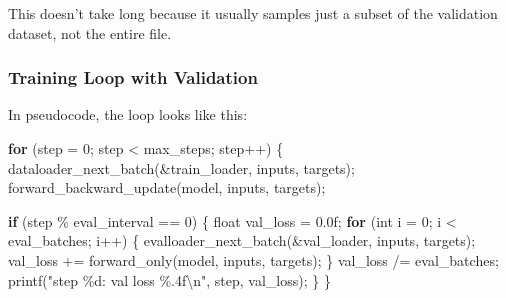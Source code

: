 \documentclass[
  letterpaper,
  DIV=11,
  numbers=noendperiod]{scrreprt}
\newenvironment{Shaded}{\begin{snugshade}}{\end{snugshade}}
\newcommand{\BuiltInTok}[1]{\textcolor[rgb]{0.00,0.23,0.31}{#1}}
\newcommand{\ControlFlowTok}[1]{\textcolor[rgb]{0.00,0.23,0.31}{\textbf{#1}}}
\newcommand{\DataTypeTok}[1]{\textcolor[rgb]{0.68,0.00,0.00}{#1}}
\newcommand{\DecValTok}[1]{\textcolor[rgb]{0.68,0.00,0.00}{#1}}
\newcommand{\FloatTok}[1]{\textcolor[rgb]{0.68,0.00,0.00}{#1}}
\newcommand{\NormalTok}[1]{\textcolor[rgb]{0.00,0.23,0.31}{#1}}
\newcommand{\OperatorTok}[1]{\textcolor[rgb]{0.37,0.37,0.37}{#1}}
\newcommand{\SpecialCharTok}[1]{\textcolor[rgb]{0.37,0.37,0.37}{#1}}
\newcommand{\StringTok}[1]{\textcolor[rgb]{0.13,0.47,0.30}{#1}}
\begin{document}
This doesn't take long because it usually samples just a subset of the
validation dataset, not the entire file.

\subsubsection{Training Loop with
Validation}\label{training-loop-with-validation}

In pseudocode, the loop looks like this:

\begin{Shaded}
\begin{Highlighting}[]
\ControlFlowTok{for} \OperatorTok{(}\NormalTok{step }\OperatorTok{=} \DecValTok{0}\OperatorTok{;}\NormalTok{ step }\OperatorTok{\textless{}}\NormalTok{ max\_steps}\OperatorTok{;}\NormalTok{ step}\OperatorTok{++)} \OperatorTok{\{}
\NormalTok{    dataloader\_next\_batch}\OperatorTok{(\&}\NormalTok{train\_loader}\OperatorTok{,}\NormalTok{ inputs}\OperatorTok{,}\NormalTok{ targets}\OperatorTok{);}
\NormalTok{    forward\_backward\_update}\OperatorTok{(}\NormalTok{model}\OperatorTok{,}\NormalTok{ inputs}\OperatorTok{,}\NormalTok{ targets}\OperatorTok{);}
    
    \ControlFlowTok{if} \OperatorTok{(}\NormalTok{step }\OperatorTok{\%}\NormalTok{ eval\_interval }\OperatorTok{==} \DecValTok{0}\OperatorTok{)} \OperatorTok{\{}
        \DataTypeTok{float}\NormalTok{ val\_loss }\OperatorTok{=} \FloatTok{0.0}\BuiltInTok{f}\OperatorTok{;}
        \ControlFlowTok{for} \OperatorTok{(}\DataTypeTok{int}\NormalTok{ i }\OperatorTok{=} \DecValTok{0}\OperatorTok{;}\NormalTok{ i }\OperatorTok{\textless{}}\NormalTok{ eval\_batches}\OperatorTok{;}\NormalTok{ i}\OperatorTok{++)} \OperatorTok{\{}
\NormalTok{            evalloader\_next\_batch}\OperatorTok{(\&}\NormalTok{val\_loader}\OperatorTok{,}\NormalTok{ inputs}\OperatorTok{,}\NormalTok{ targets}\OperatorTok{);}
\NormalTok{            val\_loss }\OperatorTok{+=}\NormalTok{ forward\_only}\OperatorTok{(}\NormalTok{model}\OperatorTok{,}\NormalTok{ inputs}\OperatorTok{,}\NormalTok{ targets}\OperatorTok{);}
        \OperatorTok{\}}
\NormalTok{        val\_loss }\OperatorTok{/=}\NormalTok{ eval\_batches}\OperatorTok{;}
\NormalTok{        printf}\OperatorTok{(}\StringTok{"step }\SpecialCharTok{\%d}\StringTok{: val loss }\SpecialCharTok{\%.4f\textbackslash{}n}\StringTok{"}\OperatorTok{,}\NormalTok{ step}\OperatorTok{,}\NormalTok{ val\_loss}\OperatorTok{);}
    \OperatorTok{\}}
\OperatorTok{\}}
\end{Highlighting}
\end{Shaded}
\end{document}
